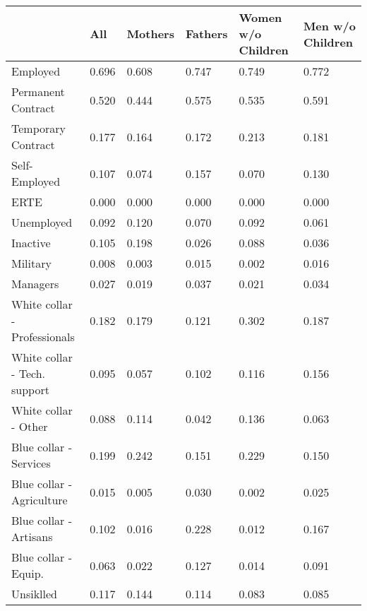 \begin{tabular}{llllll}
\toprule
{} &     All & Mothers & Fathers & Women w/o Children & Men w/o Children \\
\midrule
Employed                     &   0.696 &   0.608 &   0.747 &              0.749 &            0.772 \\
Permanent Contract           &   0.520 &   0.444 &   0.575 &              0.535 &            0.591 \\
Temporary Contract           &   0.177 &   0.164 &   0.172 &              0.213 &            0.181 \\
Self-Employed                &   0.107 &   0.074 &   0.157 &              0.070 &            0.130 \\
ERTE                         &   0.000 &   0.000 &   0.000 &              0.000 &            0.000 \\
Unemployed                   &   0.092 &   0.120 &   0.070 &              0.092 &            0.061 \\
Inactive                     &   0.105 &   0.198 &   0.026 &              0.088 &            0.036 \\
Military                     &   0.008 &   0.003 &   0.015 &              0.002 &            0.016 \\
Managers                     &   0.027 &   0.019 &   0.037 &              0.021 &            0.034 \\
White collar - Professionals &   0.182 &   0.179 &   0.121 &              0.302 &            0.187 \\
White collar - Tech. support &   0.095 &   0.057 &   0.102 &              0.116 &            0.156 \\
White collar - Other         &   0.088 &   0.114 &   0.042 &              0.136 &            0.063 \\
Blue collar - Services       &   0.199 &   0.242 &   0.151 &              0.229 &            0.150 \\
Blue collar - Agriculture    &   0.015 &   0.005 &   0.030 &              0.002 &            0.025 \\
Blue collar - Artisans       &   0.102 &   0.016 &   0.228 &              0.012 &            0.167 \\
Blue collar - Equip.         &   0.063 &   0.022 &   0.127 &              0.014 &            0.091 \\
Unsiklled                    &   0.117 &   0.144 &   0.114 &              0.083 &            0.085 \\

\end{tabular}
